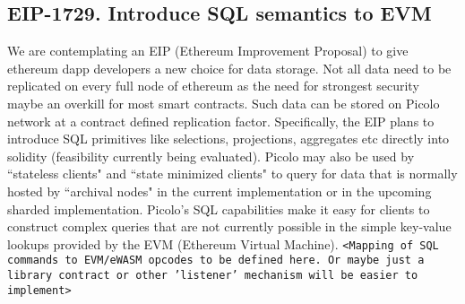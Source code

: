 \newpage

\begin{appendices}

\section{EIP-1729. Introduce SQL semantics to EVM }
We are contemplating an EIP (Ethereum Improvement Proposal) to give ethereum dapp developers a new choice for data storage. Not all data need to be replicated on every full node of ethereum as the need for strongest security maybe an overkill for most smart contracts. Such data can be stored on Picolo network at a contract defined replication factor. Specifically, the EIP plans to introduce SQL primitives like selections, projections, aggregates etc directly into solidity (feasibility currently being evaluated).
\newline
\newline
Picolo may also be used by ``stateless clients" and ``state minimized clients" to query for data that is normally hosted by ``archival nodes" in the current implementation or in the upcoming sharded implementation. Picolo's SQL capabilities make it easy for clients to construct complex queries that are not currently possible in the simple key-value lookups provided by the EVM (Ethereum Virtual Machine).
\newline\newline
\texttt{<Mapping of SQL commands to EVM/eWASM opcodes to be defined here. Or maybe just a library contract or other 'listener' mechanism will be easier to implement>}
\end{appendices}
